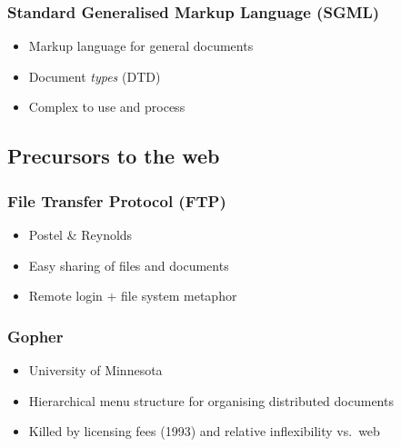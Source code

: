 

\frame
{
	\frametitle{Standard Generalised Markup Language (SGML)}

	\begin{itemize}
	
		\item Markup language for general documents
		
		\item Document \emph{types} (DTD)
		
		
		\item Complex to use and process
	
	\end{itemize}
	
}




\subsection*{Precursors to the web}




\frame
{
	\frametitle{File Transfer Protocol (FTP)}

	\begin{itemize}
	
		\item Postel \& Reynolds
	
		\item Easy sharing of files and documents
		
		\item Remote login + file system metaphor
	
	\end{itemize}
	
}





\frame
{
	\frametitle{Gopher}
	
	\begin{itemize}
	
		\item University of Minnesota
		
		\item Hierarchical menu structure for organising distributed
		documents
		
		\item Killed by licensing fees (1993) and relative inflexibility
		vs.\ web
	
	\end{itemize}

}

